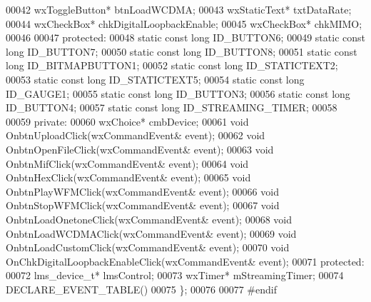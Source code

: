 \begin{DoxyCode}
00042         wxToggleButton* btnLoadWCDMA;
00043         wxStaticText* txtDataRate;
00044         wxCheckBox* chkDigitalLoopbackEnable;
00045         wxCheckBox* chkMIMO;
00046 
00047     \textcolor{keyword}{protected}:
00048         \textcolor{keyword}{static} \textcolor{keyword}{const} \textcolor{keywordtype}{long} ID_BUTTON6;
00049         \textcolor{keyword}{static} \textcolor{keyword}{const} \textcolor{keywordtype}{long} ID_BUTTON7;
00050         \textcolor{keyword}{static} \textcolor{keyword}{const} \textcolor{keywordtype}{long} ID_BUTTON8;
00051         \textcolor{keyword}{static} \textcolor{keyword}{const} \textcolor{keywordtype}{long} ID_BITMAPBUTTON1;
00052         \textcolor{keyword}{static} \textcolor{keyword}{const} \textcolor{keywordtype}{long} ID_STATICTEXT2;
00053         \textcolor{keyword}{static} \textcolor{keyword}{const} \textcolor{keywordtype}{long} ID_STATICTEXT5;
00054         \textcolor{keyword}{static} \textcolor{keyword}{const} \textcolor{keywordtype}{long} ID_GAUGE1;
00055         \textcolor{keyword}{static} \textcolor{keyword}{const} \textcolor{keywordtype}{long} ID_BUTTON3;
00056         \textcolor{keyword}{static} \textcolor{keyword}{const} \textcolor{keywordtype}{long} ID_BUTTON4;
00057         \textcolor{keyword}{static} \textcolor{keyword}{const} \textcolor{keywordtype}{long} ID_STREAMING_TIMER;
00058 
00059     \textcolor{keyword}{private}:
00060         wxChoice* cmbDevice;
00061         \textcolor{keywordtype}{void} OnbtnUploadClick(wxCommandEvent& event);
00062         \textcolor{keywordtype}{void} OnbtnOpenFileClick(wxCommandEvent& event);
00063         \textcolor{keywordtype}{void} OnbtnMifClick(wxCommandEvent& event);
00064         \textcolor{keywordtype}{void} OnbtnHexClick(wxCommandEvent& event);
00065         \textcolor{keywordtype}{void} OnbtnPlayWFMClick(wxCommandEvent& event);
00066         \textcolor{keywordtype}{void} OnbtnStopWFMClick(wxCommandEvent& event);
00067         \textcolor{keywordtype}{void} OnbtnLoadOnetoneClick(wxCommandEvent& event);
00068         \textcolor{keywordtype}{void} OnbtnLoadWCDMAClick(wxCommandEvent& event);
00069         \textcolor{keywordtype}{void} OnbtnLoadCustomClick(wxCommandEvent& event);
00070         \textcolor{keywordtype}{void} OnChkDigitalLoopbackEnableClick(wxCommandEvent& event);
00071     \textcolor{keyword}{protected}:
00072         lms_device_t* lmsControl;
00073         wxTimer* mStreamingTimer;
00074         DECLARE\_EVENT\_TABLE()
00075 \};
00076 
00077 \textcolor{preprocessor}{#endif}
\end{DoxyCode}
